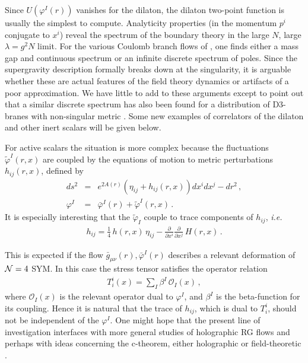 \documentclass[a4paper,12pt]{article}
\def\varphit{\tilde{\varphi}}
\begin{document}
Since $U(\varphi^I(r))$ vanishes for the dilaton, the dilaton
two-point function is usually the simplest to compute. Analyticity
properties (in the momentum $p^i$ conjugate to $x^i$) reveal the
spectrum of the boundary theory in the large $N$, large $\lambda=g^2N$
limit. For the various Coulomb branch flows of \cite{fgpw2, bs}, one finds
either a mass gap and continuous spectrum or an infinite discrete
spectrum of poles. Since the supergravity description formally breaks
down at the singularity, it is arguable whether these are actual
features of the field theory dynamics or artifacts of a poor
approximation. We have little to add to these arguments except to
point out that a similar discrete spectrum has also been found for a
distribution of D3-branes with non-singular metric \cite{cr}. Some new
examples of correlators of the dilaton and other inert scalars will be
given below.

For active
scalars the situation is more complex because the fluctuations
$\varphit^I(r,x)$ are coupled by the equations of motion to metric
perturbations $h_{ij}(r,x)$, defined by
\begin{eqnarray}
ds^2 &=& e^{2A(r)} \left( \eta_{ij} + h_{ij}(r,x) \right) dx^i dx^j
- dr^2 \,, \\
\nonumber
\varphi^I &=& \bar\varphi^I(r) + \varphit^I(r,x) \,.
\end{eqnarray}
It is especially interesting that the $\varphit_I$ couple to trace
components of $h_{ij}$, {\em i.e.}
\begin{eqnarray}
h_{ij} = \frac{1}{4} \, h(r,x) \, \eta_{ij} - \frac{\partial}{\partial x^i} \frac{\partial}{\partial x^j} \, H(r,x) \,. 
\end{eqnarray}

This is expected if the flow $\bar{g}_{\mu\nu}(r), \bar{\varphi}^I(r)$
describes a relevant deformation of ${\cal N}=4$ SYM.  In this case
the stress tensor satisfies the operator relation
\begin{eqnarray}
\label{TequalsO}
T^i_i(x) = \sum_I \beta^I \, {\mathcal O}_I(x) \,,
\end{eqnarray}
where ${\mathcal O}_I(x)$ is the relevant operator dual to
$\varphi^I$, and $\beta^I$ is the beta-function for its coupling.
Hence it is natural that the trace of $h_{ij}$, which is dual to
$T^i_i$, should not be independent of the $\varphi^I$.  One might hope
that the present line of investigation interfaces with more general
studies of holographic RG flows \cite{bk,dbvv} and perhaps with ideas
concerning the c-theorem, either holographic \cite{gppz1,fgpw1,agpz} or 
field-theoretic \cite{fl,anselmi,acs}.
\end{document}
